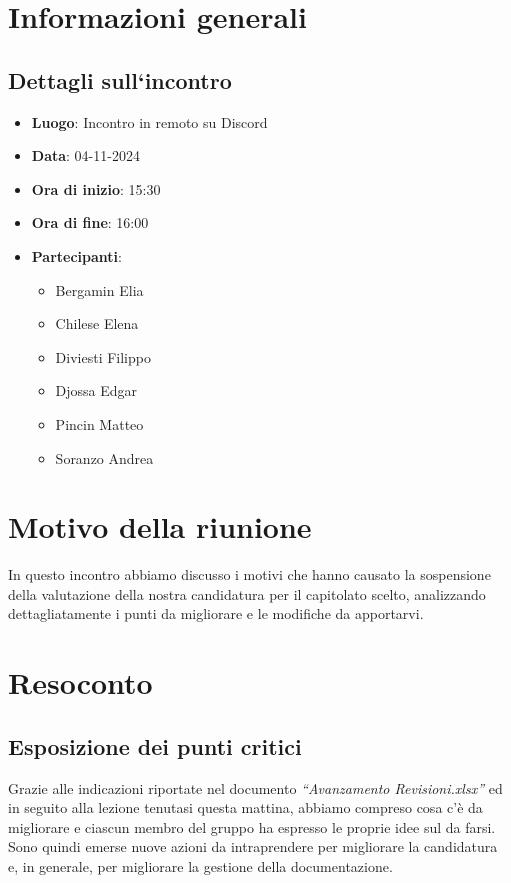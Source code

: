 \section{Informazioni generali}
\subsection{Dettagli sull`incontro}
\begin{itemize}
    \item \textbf{Luogo}: Incontro in remoto su Discord
    \item \textbf{Data}: 04-11-2024
    \item \textbf{Ora di inizio}: 15:30
    \item \textbf{Ora di fine}: 16:00
    \item \textbf{Partecipanti}:
    \begin{itemize}
        \item Bergamin Elia
        \item Chilese Elena
        \item Diviesti Filippo
        \item Djossa Edgar
        \item Pincin Matteo 
        \item Soranzo Andrea  
    \end{itemize}
\end{itemize}

\section{Motivo della riunione}
In questo incontro abbiamo discusso i motivi che hanno causato la sospensione della valutazione della nostra candidatura per il capitolato scelto, analizzando dettagliatamente i punti da migliorare e le modifiche da apportarvi.
\section{Resoconto}

\subsection{Esposizione dei punti critici}
Grazie alle indicazioni riportate nel documento \textit{“Avanzamento Revisioni.xlsx”} ed in seguito alla lezione tenutasi questa mattina, abbiamo compreso cosa c'è da migliorare e ciascun membro del gruppo ha espresso le proprie idee sul da farsi. \\
Sono quindi emerse nuove azioni da intraprendere per migliorare la candidatura e, in generale, per migliorare la gestione della documentazione.

